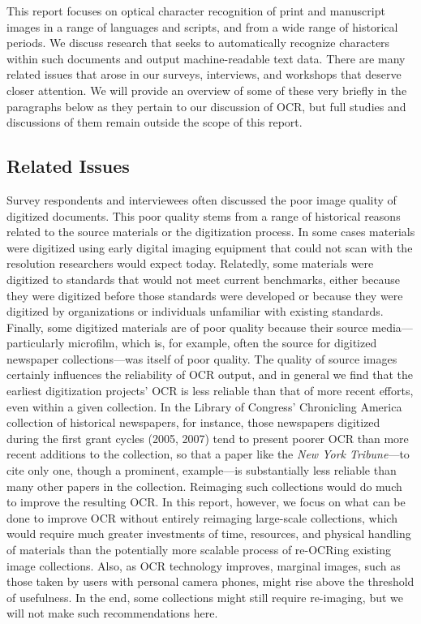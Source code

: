 \documentclass[twoside,11pt]{report}
\begin{document}
This report focuses on optical character recognition of print and manuscript images in a range of languages and scripts, and from a wide range of historical periods. We discuss research that seeks to automatically recognize characters within such documents and output machine-readable text data. There are many related issues that arose in our surveys, interviews, and workshops that deserve closer attention. We will provide an overview of some of these very briefly in the paragraphs below as they pertain to our discussion of OCR, but full studies and discussions of them remain outside the scope of this report.

\subsection{Related Issues}

Survey respondents and interviewees often discussed the poor image quality of digitized documents. This poor quality stems from a range of historical reasons related to the source materials or the digitization process. In some cases materials were digitized using early digital imaging equipment that could not scan with the resolution researchers would expect today. Relatedly, some materials were digitized to standards that would not meet current benchmarks, either because they were digitized before those standards were developed or because they were digitized by organizations or individuals unfamiliar with existing standards. Finally, some digitized materials are of poor quality because their source media---particularly microfilm, which is, for example, often the source for digitized newspaper collections---was itself of poor quality. The quality of source images certainly influences the reliability of OCR output, and in general we find that the earliest digitization projects' OCR is less reliable than that of more recent efforts, even within a given collection. In the Library of Congress' Chronicling America collection of historical newspapers, for instance, those newspapers digitized during the first grant cycles (2005, 2007) tend to present poorer OCR than more recent additions to the collection, so that a paper like the \emph{New York Tribune}---to cite only one, though a prominent, example---is substantially less reliable than many other papers in the collection. Reimaging such collections would do much to improve the resulting OCR. In this report, however, we focus on what can be done to improve OCR without entirely reimaging large-scale collections, which would require much greater investments of time, resources, and physical handling of materials than the potentially more scalable process of re-OCRing existing image collections. Also, as OCR technology improves, marginal images, such as those taken by users with personal camera phones, might rise above the threshold of usefulness. In the end, some collections might still require re-imaging, but we will not make such recommendations here.
\end{document}
